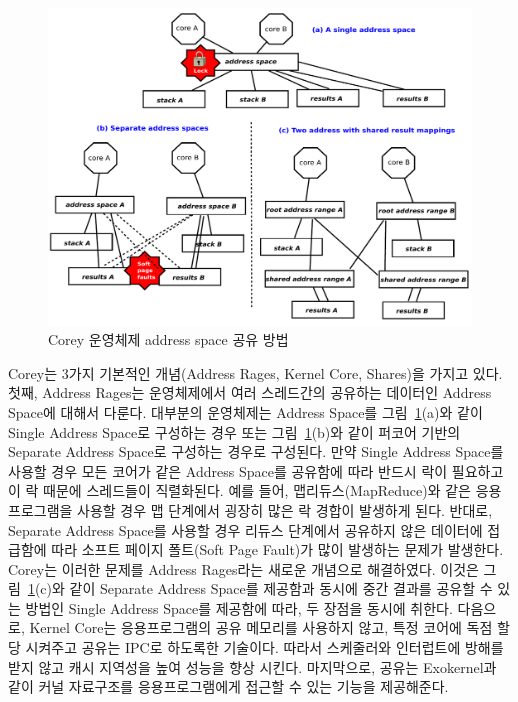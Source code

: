 \begin{figure}[h!]
    \centering
    \includegraphics[width=1\textwidth]{fig/corey/corey}
    \caption{Corey 운영체제 address space 공유 방법}
  \label{fig:corey}
\end{figure}

Corey는 3가지 기본적인 개념(Address Rages, Kernel Core, Shares)을 가지고 있다. 
첫째, Address Rages는 운영체제에서 여러 스레드간의 공유하는 데이터인 Address Space에 대해서 다룬다.
대부분의 운영체제는 Address Space를 그림~\ref{fig:corey}(a)와 같이 Single Address Space로
구성하는 경우 또는 그림~\ref{fig:corey}(b)와 같이 퍼코어 기반의 Separate Address Space로 구성하는 경우로
구성된다. 
만약 Single Address Space를 사용할 경우 모든 코어가 같은 Address Space를 공유함에 따라 반드시 락이
필요하고 이 락 때문에 스레드들이 직렬화된다.
예를 들어, 맵리듀스(MapReduce)와 같은 응용프로그램을 사용할 경우 맵 단계에서 굉장히 많은 락 경합이 발생하게 된다.
반대로, Separate Address Space를 사용할 경우 리듀스 단계에서 공유하지 않은 데이터에 접급함에 따라 
소프트 페이지 폴트(Soft Page Fault)가 많이 발생하는 문제가 발생한다.
Corey는 이러한 문제를 Address Rages라는 새로운 개념으로 해결하였다. 
이것은 그림~\ref{fig:corey}(c)와 같이 Separate Address Space를 제공함과 동시에 중간 결과를 공유할 수 있는
방법인 Single Address Space를 제공함에 따라, 두 장점을 동시에 취한다.
다음으로, Kernel Core는 응용프로그램의 공유 메모리를 사용하지 않고, 특정 코어에 
독점 할당 시켜주고 공유는 IPC로 하도록한 기술이다. 
따라서 스케줄러와 인터럽트에 방해를 받지 않고 캐시 지역성을 높여 성능을 향상 시킨다. 
마지막으로, 공유는 Exokernel과 같이 커널 자료구조를 응용프로그램에게 접근할 수 있는 
기능을 제공해준다.


